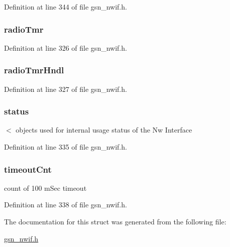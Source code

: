 Definition at line 344 of file gsn\_\-nwif.h.

\hypertarget{a00167_a0e030509c91ba81863d5adfca4820654}{
\subsubsection[{radioTmr}]{ {\bf radioTmr}}}
\label{a00167_a0e030509c91ba81863d5adfca4820654}


Definition at line 326 of file gsn\_\-nwif.h.

\hypertarget{a00167_af2cb244344f575f7e8a429889b11a496}{
\subsubsection[{radioTmrHndl}]{ {\bf radioTmrHndl}}}
\label{a00167_af2cb244344f575f7e8a429889b11a496}


Definition at line 327 of file gsn\_\-nwif.h.

\hypertarget{a00167_a88c0ed52892de848067fb8ac7d094883}{
\subsubsection[{status}]{ {\bf status}}}
\label{a00167_a88c0ed52892de848067fb8ac7d094883}
$<$ objects used for internal usage status of the Nw Interface 

Definition at line 335 of file gsn\_\-nwif.h.

\hypertarget{a00167_a736d67ad1614d227113f632badbe136a}{
\subsubsection[{timeoutCnt}]{ {\bf timeoutCnt}}}
\label{a00167_a736d67ad1614d227113f632badbe136a}
count of 100 mSec timeout 

Definition at line 338 of file gsn\_\-nwif.h.



The documentation for this struct was generated from the following file:\begin{DoxyCompactItemize}
\item 
\hyperlink{a00534}{gsn\_\-nwif.h}\end{DoxyCompactItemize}
